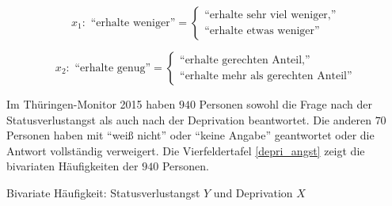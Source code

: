 \documentclass[11pt]{article}
\begin{document}
\begin{enumerate}
\begin{itemize}
{\begin{description}
     \item {
       \[
     \text{$x_{1}:$ ``erhalte weniger''}=\left\{\begin{array}{ll} \text{``erhalte sehr viel weniger,''} \\
         \text{``erhalte etwas weniger''}\end{array}\right. 
  \]
     }
      \item {
       \[
     \text{$x_{2}:$ ``erhalte genug''}=\left\{\begin{array}{ll} \text{``erhalte gerechten Anteil,''} \\
         \text{``erhalte mehr als gerechten Anteil''}\end{array}\right. 
  \]
     }
    
    \end{description}
      }
 \end{itemize}

Im Thüringen-Monitor 2015 haben $940$ Personen sowohl die Frage nach der 
Statusverlustangst als auch nach der Deprivation beantwortet. Die anderen $70$ Personen haben mit ``weiß nicht'' oder ``keine Angabe''
geantwortet oder die Antwort vollständig verweigert. Die  Vierfeldertafel \ref{depri_angst} zeigt die bivariaten Häufigkeiten
der $940$ Personen.


  \begin{table}[ht]
\centering
\caption{Bivariate Häufigkeit: Statusverlustangst $Y$ und Deprivation $X$}




\end{table}
\end{enumerate}
\end{document}
